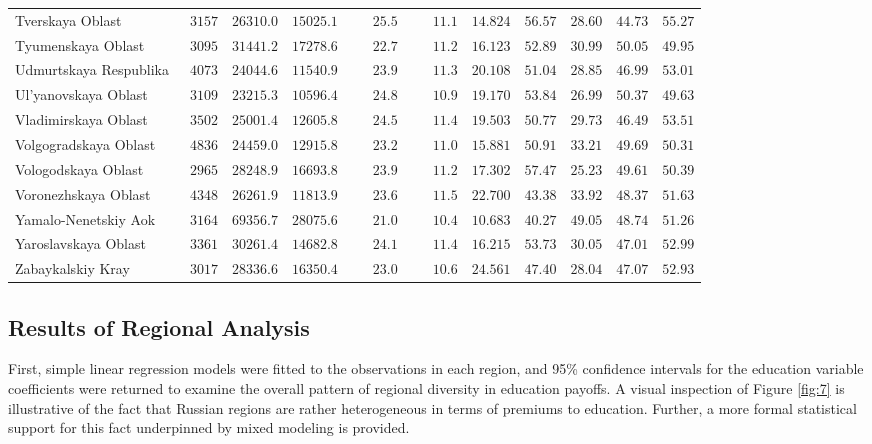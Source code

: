 \documentclass[12pt,a4paper]{article}
\numberwithin{equation}{section}
\begin{document}
{\begin{longtable}{lcccccccccc}
		Tverskaya Oblast  & $\phantom{0}3157$ & $26310.0$ & $15025.1$ & $\phantom{000}25.5$ & $\phantom{000}11.1$ & $14.824$ & $56.57$ & $28.60$ & $44.73$ & $55.27$ \\
		Tyumenskaya Oblast  & $\phantom{0}3095$ & $31441.2$ & $17278.6$ & $\phantom{000}22.7$ & $\phantom{000}11.2$ & $16.123$ & $52.89$ & $30.99$ & $50.05$ & $49.95$ \\
		Udmurtskaya Respublika  & $\phantom{0}4073$ & $24044.6$ & $11540.9$ & $\phantom{000}23.9$ & $\phantom{000}11.3$ & $20.108$ & $51.04$ & $28.85$ & $46.99$ & $53.01$ \\
		Ul'yanovskaya Oblast  & $\phantom{0}3109$ & $23215.3$ & $10596.4$ & $\phantom{000}24.8$ & $\phantom{000}10.9$ & $19.170$ & $53.84$ & $26.99$ & $50.37$ & $49.63$ \\
		Vladimirskaya Oblast  & $\phantom{0}3502$ & $25001.4$ & $12605.8$ & $\phantom{000}24.5$ & $\phantom{000}11.4$ & $19.503$ & $50.77$ & $29.73$ & $46.49$ & $53.51$ \\
		Volgogradskaya Oblast  & $\phantom{0}4836$ & $24459.0$ & $12915.8$ & $\phantom{000}23.2$ & $\phantom{000}11.0$ & $15.881$ & $50.91$ & $33.21$ & $49.69$ & $50.31$ \\
		Vologodskaya Oblast  & $\phantom{0}2965$ & $28248.9$ & $16693.8$ & $\phantom{000}23.9$ & $\phantom{000}11.2$ & $17.302$ & $57.47$ & $25.23$ & $49.61$ & $50.39$ \\
		Voronezhskaya Oblast  & $\phantom{0}4348$ & $26261.9$ & $11813.9$ & $\phantom{000}23.6$ & $\phantom{000}11.5$ & $22.700$ & $43.38$ & $33.92$ & $48.37$ & $51.63$ \\
		Yamalo-Nenetskiy Aok  & $\phantom{0}3164$ & $69356.7$ & $28075.6$ & $\phantom{000}21.0$ & $\phantom{000}10.4$ & $10.683$ & $40.27$ & $49.05$ & $48.74$ & $51.26$ \\
		Yaroslavskaya Oblast  & $\phantom{0}3361$ & $30261.4$ & $14682.8$ & $\phantom{000}24.1$ & $\phantom{000}11.4$ & $16.215$ & $53.73$ & $30.05$ & $47.01$ & $52.99$ \\
		Zabaykalskiy Kray  & $\phantom{0}3017$ & $28336.6$ & $16350.4$ & $\phantom{000}23.0$ & $\phantom{000}10.6$ & $24.561$ & $47.40$ & $28.04$ & $47.07$ & $52.93$ \\
		\hline 
	\end{longtable}
}

\subsection*{Results of Regional Analysis}
First, simple linear regression models were fitted to the observations in each region, and 95\% confidence intervals for the education variable coefficients were returned to examine the overall pattern of regional diversity in education payoffs. A visual inspection of Figure \ref{fig:7} is illustrative of the fact that Russian regions are rather heterogeneous in terms of premiums to education. Further, a more formal statistical support for this fact underpinned by mixed modeling is provided.
\end{document}
